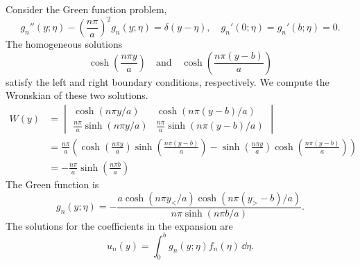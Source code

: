 {\begin{Solution}
  Consider the Green function problem,
  \[
  g_n''(y;\eta) - \left( \frac{n \pi}{a} \right)^2 g_n(y;\eta) = \delta(y-\eta),
  \quad 
  g_n'(0;\eta) = g_n'(b;\eta) = 0.
  \]
  The homogeneous solutions
  \[
  \cosh \left( \frac{ n \pi y}{a} \right) \quad \mathrm{and} \quad
  \cosh \left( \frac{ n \pi (y-b)}{a} \right)
  \]
  satisfy the left and right boundary conditions, respectively.
  We compute the Wronskian of these two solutions.
  \begin{align*}
    W(y)    
    &= \begin{vmatrix}
      \cosh( n \pi y / a) & \cosh( n \pi (y-b) / a ) \\
      \frac{n \pi}{a} \sinh( n \pi y / a) & \frac{n \pi}{a} \sinh( n \pi (y-b) / a ) 
    \end{vmatrix} 
    \\
    &= \frac{n \pi}{a} \left( 
      \cosh \left( \frac{n \pi y}{a} \right)
      \sinh \left( \frac{n \pi (y-b)}{a} \right)
      - \sinh \left( \frac{n \pi y}{a} \right)
      \cosh \left( \frac{n \pi (y-b)}{a} \right) \right) 
    \\
    &= - \frac{n \pi}{a} \sinh \left( \frac{n \pi b}{a} \right)
  \end{align*}
  The Green function is
  \[
  \boxed{
    g_n(y;\eta) = - \frac{ a \cosh( n \pi y_< / a) \cosh( n \pi (y_>-b) / a) }
    { n \pi \sinh( n \pi b / a ) }.
    }
  \]
  The solutions for the coefficients in the expansion are
  \[
  \boxed{
    u_n(y) = \int_0^b g_n(y;\eta) f_n(\eta) \,\dd \eta.
    }
  \]
\end{Solution}












}
